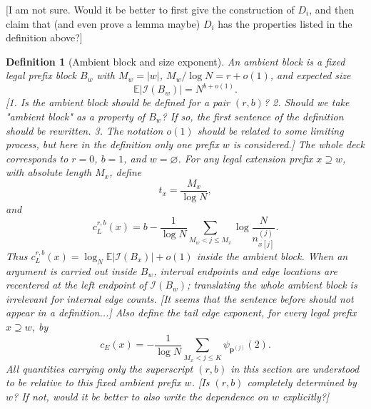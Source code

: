 \documentclass[11pt]{article}
\newtheorem{defi}{Definition}
\newcommand{\cI}{\mathcal I}
\newcommand{\E}{\mathbb E}
\newcommand{\bp}{\mathbf p}
\newcommand{\jscomment}[1]{\textup{\textsf{\color{blue}[#1]}}}
\begin{document}
\jscomment{I am not sure. Would it be better to first give the construction of $D_i$, and then claim that (and even prove a lemma maybe) $D_i$ has the properties listed in the definition above?}

\begin{defi}[Ambient block and size exponent]
An ambient block is a fixed legal prefix block \(B_w\) with
\(M_w=|w|\), \(M_w/\log N=r+o(1)\), and expected size
\[
    \E|\cI(B_w)|=N^{b+o(1)}.
\]
\jscomment{1. Is the ambient block should be defined for a pair $(r,b)$? 2. Should we take "ambient block" as a property of $B_w$? If so, the first sentence of the definition should be rewritten. 3. The notation $o(1)$ should be related to some limiting process, but here in the definition only one prefix $w$ is considered.}
The whole deck corresponds to \(r=0\), \(b=1\), and \(w=\varnothing\). For any legal extension prefix \(x\supseteq w\), with absolute length \(M_x\), define
\[
    t_x=\frac{M_x}{\log N},
\]
and
\[
    c_L^{r,b}(x)
    =
    b-\frac1{\log N}\sum_{M_w<j\le M_x}
    \log\frac{N}{n_{x[j]}^{(j)}} .
\]
Thus \(c_L^{r,b}(x)=\log_N\E|\cI(B_x)|+o(1)\) inside the ambient block.
When an argument is carried out inside \(B_w\), interval endpoints and
edge locations are recentered at the left endpoint of \(\cI(B_w)\);
translating the whole ambient block is irrelevant for internal edge
counts. \jscomment{It seems that the sentence before should not appear in a definition...}
Also define the tail edge exponent, for every legal prefix \(x\supseteq w\), by
\[
    c_E(x)=-\frac1{\log N}\sum_{M_x<j\le K}\psi_{\bp^{(j)}}(2).
\]
All quantities carrying only the superscript \((r,b)\) in this section are
understood to be relative to this fixed ambient prefix \(w\).
\jscomment{Is $(r,b)$ completely determined by $w$? If not, would it be better to also write the dependence on $w$ explicitly?}
\end{defi}
\end{document}

